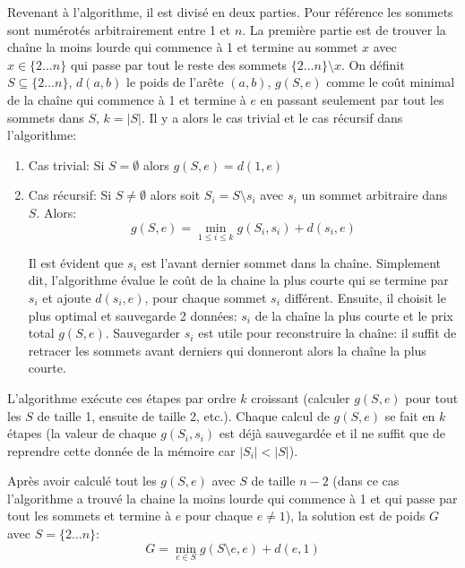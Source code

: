 \documentclass[../main.tex]{subfiles}
\begin{document}
Revenant à l'algorithme, il est divisé en deux parties. Pour référence les sommets sont numérotés arbitrairement entre 1 et $n$. La première partie est de trouver la chaîne la moins lourde qui commence à 1 et termine au sommet $x$ avec $x \in \{2\dots n\}$ qui passe par tout le reste des sommets $\{2\dots n\} \setminus x$. On définit $S \subseteq \{2\dots n\}$, $d(a,b)$ le poids de l'arête $(a,b)$, $g(S, e)$ comme le coût minimal de la chaîne qui commence à 1 et termine à $e$ en passant seulement par tout les sommets dans $S$, $k = |S|$. Il y a alors le cas trivial et le cas récursif dans l'algorithme:
\begin{enumerate}
\item Cas trivial: Si $S=\emptyset$ alors $g(S, e) = d(1,e)$
\item Cas récursif: Si $S \neq \emptyset$ alors soit $S_i = S \setminus s_i$ avec $s_i$ un sommet arbitraire dans $S$. Alors:
\[
g(S, e) = \min _{1 \leq i \leq k} g(S_i, s_i) + d(s_i, e)
\]

Il est évident que $s_i$ est l'avant dernier sommet dans la chaîne. Simplement dit, l'algorithme évalue le coût de la chaine la plus courte qui se termine par $s_i$ et ajoute $d(s_i, e)$, pour chaque sommet $s_i$ différent. Ensuite, il choisit le plus optimal et sauvegarde 2 données: $s_i$ de la chaîne la plus courte et le prix total $g(S,e)$. Sauvegarder $s_i$ est utile pour reconstruire la chaîne: il suffit de retracer les sommets avant derniers qui donneront alors la chaîne la plus courte.
\end{enumerate}

L'algorithme exécute ces étapes par ordre $k$ croissant (calculer $g(S,e)$ pour tout les $S$ de taille 1, ensuite de taille 2, etc.). Chaque calcul de $g(S,e)$ se fait en $k$ étapes (la valeur de chaque $g(S_i, s_i)$ est déjà sauvegardée et il ne suffit que de reprendre cette donnée de la mémoire car $|S_i| < |S|$).

Après avoir calculé tout les $g(S, e)$ avec $S$ de taille $n-2$ (dans ce cas l'algorithme a trouvé la chaine la moins lourde qui commence à 1 et qui passe par tout les sommets et termine à $e$ pour chaque $e \neq 1$), la solution est de poids $G$ avec $S = \{2\dots n\}$:
\[
G = \min _{e \in S} g(S \setminus e, e) + d(e, 1)
\]
\end{document}
